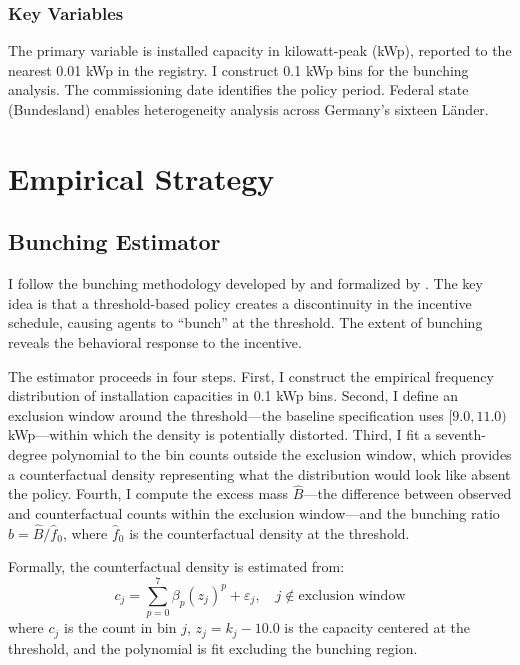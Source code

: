\documentclass[12pt]{article}
\begin{document}
\subsubsection*{Key Variables} The primary variable is installed capacity in kilowatt-peak (kWp), reported to the nearest 0.01 kWp in the registry. I construct 0.1 kWp bins for the bunching analysis. The commissioning date identifies the policy period. Federal state (Bundesland) enables heterogeneity analysis across Germany's sixteen L\"{a}nder.




\section{Empirical Strategy}

\subsection{Bunching Estimator}

I follow the bunching methodology developed by \citet{saez2010taxpayers} and formalized by \citet{kleven2013using}. The key idea is that a threshold-based policy creates a discontinuity in the incentive schedule, causing agents to ``bunch'' at the threshold. The extent of bunching reveals the behavioral response to the incentive.

The estimator proceeds in four steps. First, I construct the empirical frequency distribution of installation capacities in 0.1 kWp bins. Second, I define an exclusion window around the threshold---the baseline specification uses $[9.0, 11.0)$ kWp---within which the density is potentially distorted. Third, I fit a seventh-degree polynomial to the bin counts outside the exclusion window, which provides a counterfactual density representing what the distribution would look like absent the policy. Fourth, I compute the excess mass $\hat{B}$---the difference between observed and counterfactual counts within the exclusion window---and the bunching ratio $\hat{b} = \hat{B}/\hat{f}_0$, where $\hat{f}_0$ is the counterfactual density at the threshold.

Formally, the counterfactual density is estimated from:
\begin{equation}
c_j = \sum_{p=0}^{7} \beta_p (z_j)^p + \varepsilon_j, \quad j \notin \text{exclusion window}
\end{equation}
where $c_j$ is the count in bin $j$, $z_j = k_j - 10.0$ is the capacity centered at the threshold, and the polynomial is fit excluding the bunching region.
\end{document}
